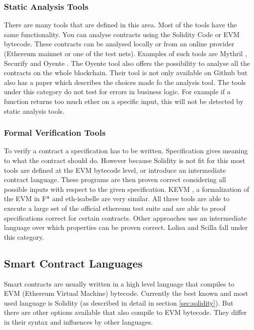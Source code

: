 \documentclass[a4paper]{article}
\begin{document}
\subsubsection{Static Analysis Tools}
There are many tools that are defined in this area. Most of the tools have the same functionality. You can analyse contracts using the Solidity Code or EVM bytecode. These contracts can be analysed locally or from an online provider (Ethereum mainnet or one of the test nets). Examples of such tools are Mythril \cite{mythrilrepo}, Securify \cite{securifywebsite} and Oyente \cite{luu2016making}. The Oyente tool also offers the possibility to analyse all the contracts on the whole blockchain. Their tool is not only available on Github but also has a paper which describes the choices made fo the analysis tool. The tools under this category do not test for errors in business logic. For example if a function returns too much ether on a specific input, this will not be detected by static analysis tools. 
\subsubsection{Formal Verification Tools}
To verify a contract a specification has to be written. Specification gives meaning to what the contract should do. However because Solidity is not fit for this most tools are defined at the EVM bytecode level, or introduce an intermediate contract language. These programs are then proven correct considering all possible inputs with respect to the given specification. KEVM \cite{hildenbrandt2017kevm}, a formalization of the EVM in F* \cite{grishchenko2018semantic} and eth-isabelle \cite{hirai2017defining} are very similar. All three tools are able to execute a large set of the official ethereum test suite and are able to proof specifications correct for certain contracts. Other approaches use an intermediate language over which properties can be proven correct. Lolisa \cite{yang2018lolisa} and Scilla \cite{sergey2018scilla} fall under this category. 

\subsection{Smart Contract Languages}
Smart contracts are usually written in a high level language that compiles to EVM (Ethereum Virtual Machine) bytecode. Currently the best known and most used language is Solidity (as described in detail in section \ref{sec:solidity}). But there are other options available that also compile to EVM bytecode. They differ in their syntax and influences by other languages.  
\end{document}
